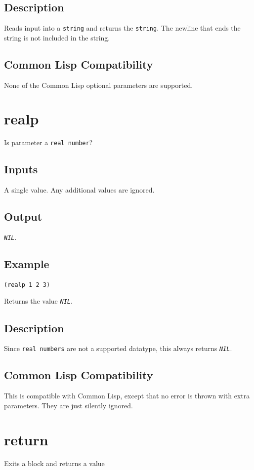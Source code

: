 \documentclass[10pt, openany]{book}
\newcommand{\constant}[1]{\emph{\texttt{#1}}}
\newcommand{\datatype}[1]{\texttt{#1}}
\newcommand{\cl}{Common Lisp}
\begin{document}
\subsection{Description}
Reads input into a \datatype{string} and returns the \datatype{string}.  The newline that ends the string is not included in the string.
\subsection{Common Lisp Compatibility}
None of the \cl{} optional parameters are supported.

\section{realp}
Is parameter a \datatype{real number}?
\subsection{Inputs}
A single value.  Any additional values are ignored.
\subsection{Output}
\constant{NIL}.
\subsection{Example}
\begin{lstlisting}
(realp 1 2 3)
\end{lstlisting}
Returns the value \constant{NIL}.
\subsection{Description}
Since \datatype{real numbers} are not a supported datatype, this always returns \constant{NIL}.
\subsection{Common Lisp Compatibility}
This is compatible with \cl, except that no error is thrown with extra parameters.  They are just silently ignored.

\section{return}
Exits a block and returns a value
\end{document}

